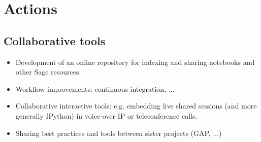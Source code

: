 \section{Actions}
\subsection{Collaborative tools}

\begin{itemize}
\item Development of an online repository for indexing and sharing
  notebooks and other Sage resources.
\item Workflow improvements: continuous integration, ...
\item Collaborative interactive tools: e.g. embedding live shared
  \sage sessions (and more generally IPython) in voice-over-IP or
  teleconference calls.


\item Sharing best practices and tools between sister projects (GAP, ...)
\end{itemize}


